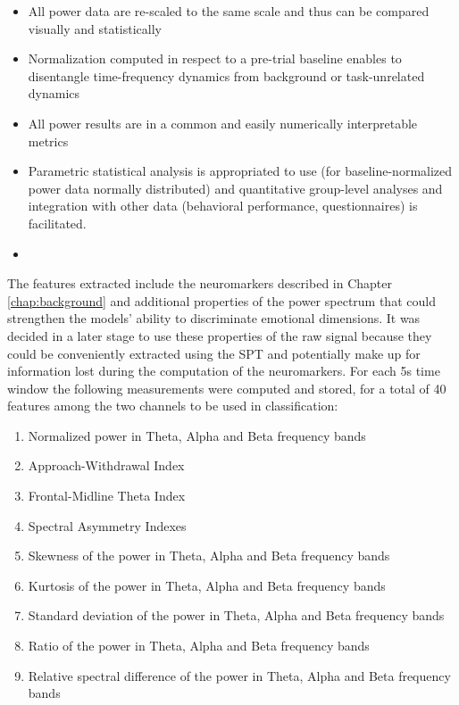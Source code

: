 \begin{itemize}
\item 	All power data are re-scaled to the same scale and thus can be compared visually and statistically
\item 	Normalization computed in respect to a pre-trial baseline enables to disentangle time-frequency dynamics from background or task-unrelated dynamics
\item 	All power results are in a common and easily numerically interpretable metrics
\item 	Parametric statistical analysis is appropriated to use (for baseline-normalized power data normally distributed) and quantitative group-level analyses and integration with other data (behavioral performance, questionnaires) is facilitated. 
\item 
\end{itemize}
The features extracted include the neuromarkers described in Chapter \ref{chap:background} and additional properties of the power spectrum that could strengthen the models’ ability to discriminate emotional dimensions. It was decided in a later stage to use these properties of the raw signal because they could be conveniently extracted using the \ac{SPT} and potentially make up for information lost during the computation of the neuromarkers.
For each 5s time window the following measurements were computed and stored, for a total of 40 features among the two channels to be used in classification:
\begin{enumerate}
\item 	Normalized power in Theta, Alpha and Beta frequency bands
\item 	Approach-Withdrawal Index 
\item 	Frontal-Midline Theta Index
\item 	Spectral Asymmetry Indexes
\item 	Skewness of the power in Theta, Alpha and Beta frequency bands
\item 	Kurtosis of the power in Theta, Alpha and Beta frequency bands
\item     Standard deviation of the power in Theta, Alpha and Beta frequency bands
\item 	Ratio of the power in Theta, Alpha and Beta frequency bands
\item 	Relative spectral difference of the power in Theta, Alpha and Beta frequency bands
\end{enumerate}


